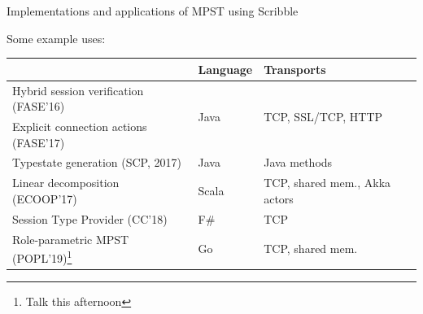 \documentclass[aspectratio=1610]{beamer}
\begin{document}
\begin{frame}{Implementations and applications of MPST using Scribble}

  Some example uses:

  \begin{table}
  \begin{tabular}{lll}
    \toprule
    & Language & Transports\\
    \midrule
    Hybrid session verification (FASE'16)  & \multirow{2}{*}{Java} &\multirow {2}{*}{\small TCP, SSL/TCP, HTTP}\\
    Explicit connection actions (FASE'17)  &      &\\
    Typestate generation (SCP, 2017)       & Java &\small Java methods\\
    Linear decomposition (ECOOP'17)        & Scala&\small TCP, shared mem., Akka actors\\
    Session Type Provider (CC'18)          & F\#  &\small TCP\\
    Role-parametric MPST (POPL'19)\footnote{Talk this afternoon} & Go   &\small TCP, shared mem.\\
    \bottomrule
  \end{tabular}
  \end{table}
\end{frame}
\end{document}
